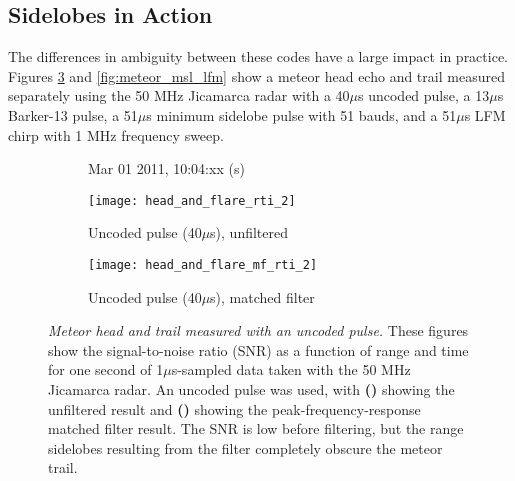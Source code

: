 \subsection{Sidelobes in Action}
The differences in ambiguity between these codes have a large impact in practice. Figures \ref{fig:meteor_uncoded_barker13} and \ref{fig:meteor_msl_lfm} show a meteor head echo and trail measured separately using the 50 MHz Jicamarca radar with a 40$\mu$s uncoded pulse, a 13$\mu$s Barker-13 pulse, a 51$\mu$s minimum sidelobe pulse with 51 bauds, and a 51$\mu$s LFM chirp with 1 MHz frequency sweep.
\begin{figure}[tpb]
 \begin{subfigure}{\textwidth}
  \centering
  \textsf{\footnotesize Mar 01 2011, 10:04:xx (s)}
  
  \texttt{[image: head\_and\_flare\_rti\_2]}
  \caption{Uncoded pulse (40$\mu$s), unfiltered}
  \label{fig:meteor_uncoded_unfiltered}
 \end{subfigure}
 
 \vspace{0.5\baselineskip}
 \begin{subfigure}{\textwidth}
  \centering
  \texttt{[image: head\_and\_flare\_mf\_rti\_2]}
  \caption{Uncoded pulse (40$\mu$s), matched filter}
  \label{fig:meteor_uncoded_mf}
 \end{subfigure}
 \caption[Meteor head and trail measured with an uncoded pulse]{\emph{Meteor head and trail measured with an uncoded pulse.} These figures show the signal-to-noise ratio (SNR) as a function of range and time for one second of 1$\mu$s-sampled data taken with the 50 MHz Jicamarca radar. An uncoded pulse was used, with \textbf{()} showing the unfiltered result and \textbf{()} showing the peak-frequency-response matched filter result. The SNR is low before filtering, but the range sidelobes resulting from the filter completely obscure the meteor trail.}
 \label{fig:meteor_uncoded_barker13}
\end{figure}%
